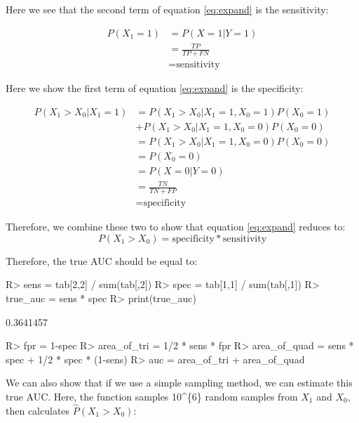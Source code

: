 \documentclass[article]{jss}
\begin{document}
Here we see that the second term of equation \eqref{eq:expand} is the
sensitivity:

\begin{align*}
P(X_{1} = 1) &= P(X = 1 | Y = 1)\\
&= \frac{TP}{TP + FN} \\
&= \text{sensitivity}
\end{align*}

Here we show the first term of equation \eqref{eq:expand} is the
specificity:

\begin{align*}
P(X_{1} > X_{0} | X_{1} = 1) &= P(X_{1} > X_{0} | X_{1} = 1, X_{0} =1) P(X_{0} = 1) \\
&+ P(X_{1} > X_{0} | X_{1} = 1, X_{0} =0) P(X_{0} = 0) \\
&= P(X_{1} > X_{0} | X_{1} = 1, X_{0} =0) P(X_{0} = 0) \\
&= P(X_{0} = 0) \\
&= P(X = 0 | Y = 0)\\
&= \frac{TN}{TN + FP} \\
&= \text{specificity}
\end{align*}

Therefore, we combine these two to show that equation \eqref{eq:expand}
reduces to: \[
P(X_{1} > X_{0}) = \text{specificity} * \text{sensitivity}
\]

Therefore, the true AUC should be equal to:

\begin{CodeChunk}

\begin{CodeInput}
R> sens = tab[2,2] / sum(tab[,2])
R> spec = tab[1,1] / sum(tab[,1])
R> true_auc = sens * spec
R> print(true_auc)
\end{CodeInput}

\begin{CodeOutput}
[1] 0.3641457
\end{CodeOutput}
\end{CodeChunk}

\begin{CodeChunk}

\begin{CodeInput}
R> fpr = 1-spec
R> area_of_tri = 1/2 * sens * fpr
R> area_of_quad = sens * spec + 1/2 * spec * (1-sens)
R> auc = area_of_tri + area_of_quad
\end{CodeInput}
\end{CodeChunk}

We can also show that if we use a simple sampling method, we can
estimate this true AUC. Here, the function  samples
10\^{}\{6\} random samples from \(X_{1}\) and \(X_{0}\), then calculates
\(\hat{P}(X_{1} > X_{0})\):
\end{document}
